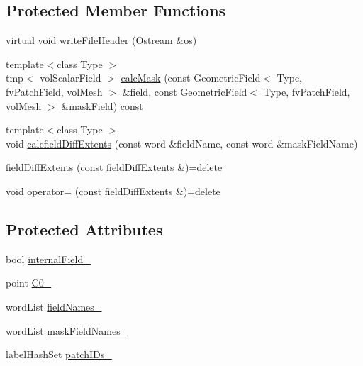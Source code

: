 \subsection*{Protected Member Functions}
\begin{DoxyCompactItemize}
\item 
virtual void \hyperlink{classFoam_1_1functionObjects_1_1fieldDiffExtents_ad0c7a238f021a605e38a115efbb20aa3}{write\+File\+Header} (Ostream \&os)
\item 
{\footnotesize template$<$class Type $>$ }\\tmp$<$ vol\+Scalar\+Field $>$ \hyperlink{classFoam_1_1functionObjects_1_1fieldDiffExtents_a6ea3a46bf40d050f6de7dc006798f9bc}{calc\+Mask} (const Geometric\+Field$<$ Type, fv\+Patch\+Field, vol\+Mesh $>$ \&field, const Geometric\+Field$<$ Type, fv\+Patch\+Field, vol\+Mesh $>$ \&mask\+Field) const
\item 
{\footnotesize template$<$class Type $>$ }\\void \hyperlink{classFoam_1_1functionObjects_1_1fieldDiffExtents_a5863af4279bc1a4ed657a8299d610ee4}{calcfield\+Diff\+Extents} (const word \&field\+Name, const word \&mask\+Field\+Name)
\item 
\hyperlink{classFoam_1_1functionObjects_1_1fieldDiffExtents_a1c8b31c50bb5c96167119b99a0ce2b72}{field\+Diff\+Extents} (const \hyperlink{classFoam_1_1functionObjects_1_1fieldDiffExtents}{field\+Diff\+Extents} \&)=delete
\item 
void \hyperlink{classFoam_1_1functionObjects_1_1fieldDiffExtents_a12faebc43605101a4748313c023a0177}{operator=} (const \hyperlink{classFoam_1_1functionObjects_1_1fieldDiffExtents}{field\+Diff\+Extents} \&)=delete
\end{DoxyCompactItemize}
\subsection*{Protected Attributes}
\begin{DoxyCompactItemize}
\item 
bool \hyperlink{classFoam_1_1functionObjects_1_1fieldDiffExtents_a723c0f12c9b5dadc2bf5d302b1cb414c}{internal\+Field\+\_\+}
\item 
point \hyperlink{classFoam_1_1functionObjects_1_1fieldDiffExtents_ab0343eaa635c4c0bc8855b811f044e76}{C0\+\_\+}
\item 
word\+List \hyperlink{classFoam_1_1functionObjects_1_1fieldDiffExtents_a4534a51bba9d2d67c051b39083fba8bc}{field\+Names\+\_\+}
\item 
word\+List \hyperlink{classFoam_1_1functionObjects_1_1fieldDiffExtents_a2edff70ce4fe84e2eb64730e389a2fef}{mask\+Field\+Names\+\_\+}
\item 
label\+Hash\+Set \hyperlink{classFoam_1_1functionObjects_1_1fieldDiffExtents_a5bc9b8b3f0fff6c74e06be4cb2846120}{patch\+I\+Ds\+\_\+}
\end{DoxyCompactItemize}


